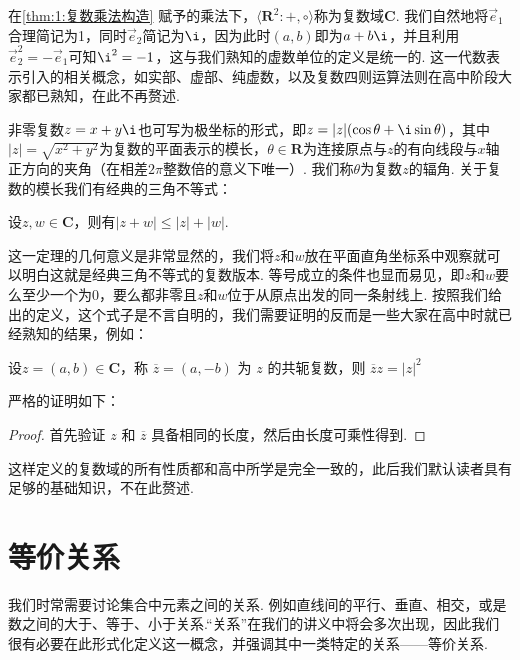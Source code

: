 在\autoref{thm:1:复数乘法构造} 赋予的乘法下，$\langle\mathbf{R}^2:+,\circ\rangle$称为复数域$\mathbf{C}$. 我们自然地将$\vec{e}_1$合理简记为1，同时$\vec{e}_2$简记为$\i$，因为此时$(a,b)$即为$a+b\i$，并且利用$\vec{e}_2^2=-\vec{e}_1$可知$\i^2=-1$，这与我们熟知的虚数单位的定义是统一的. 这一代数表示引入的相关概念，如实部、虚部、纯虚数，以及复数四则运算法则在高中阶段大家都已熟知，在此不再赘述.

非零复数$z=x+y\i$也可写为极坐标的形式，即$z=|z|(\cos\theta+\i\sin\theta)$，其中$|z|=\sqrt{x^2+y^2}$为复数的平面表示的模长，$\theta\in\mathbf{R}$为连接原点与$z$的有向线段与$x$轴正方向的夹角（在相差$2\pi$整数倍的意义下唯一）. 我们称$\theta$为复数$z$的辐角. 关于复数的模长我们有经典的三角不等式：
\begin{theorem}
    设$z,w\in\mathbf{C}$，则有$|z+w|\leqslant|z|+|w|$.
\end{theorem}

这一定理的几何意义是非常显然的，我们将$z$和$w$放在平面直角坐标系中观察就可以明白这就是经典三角不等式的复数版本. 等号成立的条件也显而易见，即$z$和$w$要么至少一个为0，要么都非零且$z$和$w$位于从原点出发的同一条射线上. 按照我们给出的定义，这个式子是不言自明的，我们需要证明的反而是一些大家在高中时就已经熟知的结果，例如：

\begin{theorem}
    设$z = (a, b) \in \mathbf{C}$，称 $\overline{z} = (a, -b)$ 为 $z$ 的共轭复数，则 $\overline{z} z = |z|^2$
\end{theorem}

严格的证明如下：

\begin{proof}
    首先验证 $z$ 和 $\overline{z}$ 具备相同的长度，然后由长度可乘性得到.
\end{proof}

这样定义的复数域的所有性质都和高中所学是完全一致的，此后我们默认读者具有足够的基础知识，不在此赘述.

\section{等价关系}

我们时常需要讨论集合中元素之间的关系. 例如直线间的平行、垂直、相交，或是数之间的大于、等于、小于关系.``关系''在我们的讲义中将会多次出现，因此我们很有必要在此形式化定义这一概念，并强调其中一类特定的关系——等价关系.

